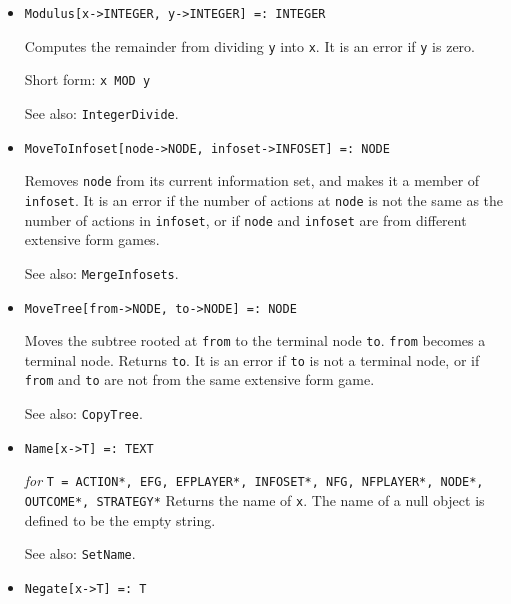 \begin{itemize}
\item{}
\protect \large \begin{verbatim}
Modulus[x->INTEGER, y->INTEGER] =: INTEGER
\end{verbatim}\normalsize

\bd
Computes the remainder from dividing \verb+y+ into \verb+x+.  It is an
error if \verb+y+ is zero.
\item [Short form:] \verb+x MOD y+
\item [See also:] \verb+IntegerDivide+.
\ed


\item{}
\protect \large \begin{verbatim}
MoveToInfoset[node->NODE, infoset->INFOSET] =: NODE
\end{verbatim}\normalsize

\bd
Removes \verb+node+ from its current information set, and makes it a
member of \verb+infoset+. It is an error if the number of actions at
\verb+node+ is not the same as the number of actions in
\verb+infoset+, or if \verb+node+ and \verb+infoset+ are from
different extensive form games.   
\item [See also:] \verb+MergeInfosets+.
\ed


\item{}
\protect \large \begin{verbatim}
MoveTree[from->NODE, to->NODE] =: NODE
\end{verbatim}\normalsize

\bd
Moves the subtree rooted at \verb+from+ to
the terminal node \verb+to+.  \verb+from+ becomes a terminal node.
Returns \verb+to+.  It is an error if \verb+to+ is not a terminal
node, or if \verb+from+ and \verb+to+ are not from the same extensive
form game.
\item [See also:] \verb+CopyTree+.
\ed


\item{}
\protect \large \begin{verbatim}
Name[x->T] =: TEXT
\end{verbatim}\normalsize

{\it for} {\tt T = ACTION*, EFG, EFPLAYER*, INFOSET*, NFG, NFPLAYER*,
NODE*, OUTCOME*, STRATEGY*} 
\bd
Returns the name of \verb+x+.  The name of a null object is defined
to be the empty string.
\item
[See also:] \verb+SetName+.
\ed

\item{} 
\protect \large \begin{verbatim}
Negate[x->T] =: T
\end{verbatim} \normalsize


\end{itemize}

